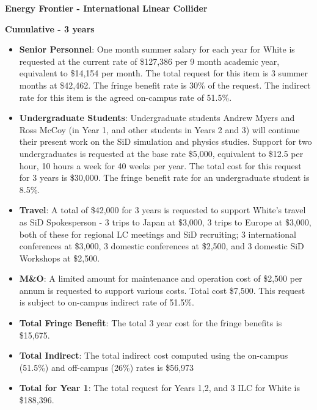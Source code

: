 \textbf{\LARGE Energy Frontier - International Linear Collider}

\textbf{Cumulative - 3 years}

\begin{itemize}

\item{{\bf Senior Personnel}: One month summer salary for each year for White is requested at the current rate of \$127,386 per 9 month academic year, 
equivalent to \$14,154 per month.  The total request for this item is 3 summer months at \$42,462. The fringe benefit rate is 30\% of the request.  
The indirect rate for this item is the agreed on-campus rate of 51.5\%.}

\item {{\bf Undergraduate Students}: Undergraduate students Andrew Myers and Ross McCoy (in Year 1, and other students in Years 2 and 3) 
will continue their present work on the SiD simulation and physics studies.
Support for two undergraduates is requested at the base rate \$5,000, equivalent to \$12.5 per hour, 10 hours a week for 40 weeks per year.  
The total cost for this request for 3 years is \$30,000.  The fringe benefit rate for an undergraduate student is 8.5\%.}

\item{{\bf Travel}: A total of \$42,000 for 3 years is requested to support White's travel as SiD Spokesperson - 3 trips to Japan at \$3,000, 3 trips to
Europe at \$3,000, both of these for regional LC meetings and SiD recruiting; 3 international conferences at \$3,000, 3 domestic conferences 
at \$2,500, and 3 domestic SiD Workshops at \$2,500.}

\item {{\bf M\&O}: A limited amount for maintenance and operation cost of \$2,500 per annum is requested to support various costs.   Total cost \$7,500.
This request is subject to on-campus indirect rate of 51.5\%.}

\item {{\bf Total Fringe Benefit}: The total 3 year cost for the fringe benefits is \$15,675.}

\item {{\bf Total Indirect}: The total indirect cost computed using the on-campus (51.5\%) and off-campus (26\%) rates is \$56,973}

\item {{\bf Total for Year 1}: The total request for Years 1,2, and 3 ILC for White is \$188,396.}

\end{itemize}
